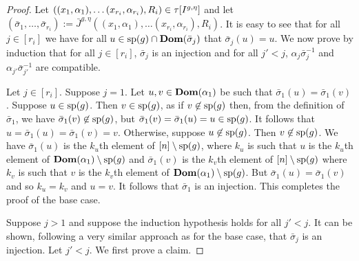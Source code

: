 \documentclass[../main/thesis.tex]{subfiles}
\begin{document}
\begin{proof}
  Let $((x_1, \alpha_1), \ldots (x_{r_i}, \alpha_{r_i}), R_i) \in
  \tau[I^{g, \eta}]$ and let $(\bar{\sigma}_1, \ldots,
  \bar{\sigma}_{r_i}) := \bar{J}^{g, \eta}((x_1, \alpha_1), \ldots (x_{r_i},
  \alpha_{r_i}), R_i)$. It is easy to see that for all $j \in [r_i]$ we have for
  all $u \in \text{sp}(g) \cap \text{\textbf{Dom}} (\bar{\sigma}_j)$ that $\bar{\sigma}_j (u) =
  u$. We now prove by induction that for all $j \in [r_i]$, $\bar{\sigma}_j$ is
  an injection and for all $j' < j$, $\alpha_j \bar{\sigma}^{-1}_j$ and
  $\alpha_{j'} \bar{\sigma}^{-1}_{j'}$ are compatible.

  Let $j \in [r_i]$. Suppose $j = 1$. Let $u, v \in \text{\textbf{Dom}}(\alpha_1)$ be such that
  $\bar{\sigma}_1(u) = \bar{\sigma}_1(v)$. Suppose $u \in \text{sp}(g)$. Then $v
  \in \text{sp}(g)$, as if $v \not\in \text{sp}(g)$ then, from the definition of
  $\bar{\sigma}_1$, we have $\bar{\sigma}_1 (v) \not\in \text{sp}(g)$, but
  $\bar{\sigma}_1(v) = \bar{\sigma}_1(u) = u \in \text{sp}(g)$. It follows that $u
  = \bar{\sigma}_1(u) = \bar{\sigma}_1(v) = v$. Otherwise, suppose $u \not\in
  \text{sp}(g)$. Then $v \not\in \text{sp}(g)$. We have $\bar{\sigma}_1(u)$ is the
  $k_u$th element of $[n] \setminus \text{sp}(g)$, where $k_u$ is such that $u$ is
  the $k_u$th element of $\text{\textbf{Dom}}(\alpha_1) \setminus \text{sp}(g)$ and
  $\bar{\sigma}_1(v)$ is the $k_v$th element of $[n] \setminus \text{sp}(g)$ where
  $k_v$ is such that $v$ is the $k_v$th element of $\text{\textbf{Dom}}(\alpha_1) \setminus
  \text{sp}(g)$. But $\bar{\sigma}_1(u) = \bar{\sigma}_1 (v)$ and so $k_u = k_v$
  and $u = v$. It follows that $\bar{\sigma}_1$ is an injection. This completes
  the proof of the base case.

  Suppose $j > 1$ and suppose the induction hypothesis holds for all $j' < j$.
  It can be shown, following a very similar approach as for the base case, that
  $\bar{\sigma}_j$ is an injection. Let $j' < j$. We first prove a claim.
  

\end{proof}
\end{document}
